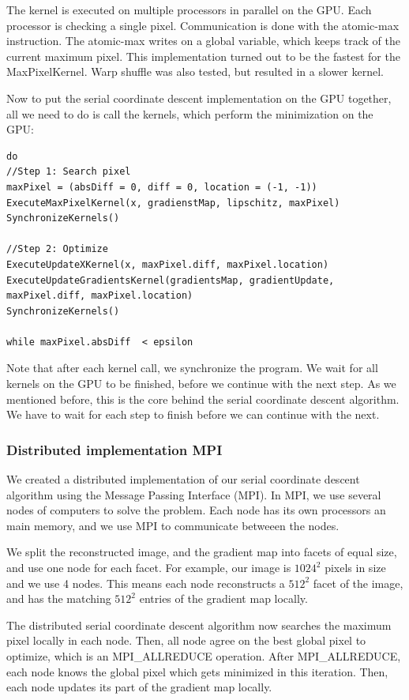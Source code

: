 The kernel is executed on multiple processors in parallel on the GPU. Each processor is checking a single pixel. Communication is done with the atomic-max instruction. The atomic-max writes on a global variable, which keeps track of the current maximum pixel. This implementation turned out to be the fastest for the MaxPixelKernel. Warp shuffle\cite{keplerShuffle} was also tested, but resulted in a slower kernel.

Now to put the serial coordinate descent implementation on the GPU together, all we need to do is call the kernels, which perform the minimization on the GPU:


\begin{lstlisting}
do 
//Step 1: Search pixel
maxPixel = (absDiff = 0, diff = 0, location = (-1, -1))
ExecuteMaxPixelKernel(x, gradienstMap, lipschitz, maxPixel)
SynchronizeKernels()

//Step 2: Optimize
ExecuteUpdateXKernel(x, maxPixel.diff, maxPixel.location)
ExecuteUpdateGradientsKernel(gradientsMap, gradientUpdate, maxPixel.diff, maxPixel.location)
SynchronizeKernels()

while maxPixel.absDiff  < epsilon
\end{lstlisting}

Note that after each kernel call, we synchronize the program. We wait for all kernels on the GPU to be finished, before we continue with the next step. As we mentioned before, this is the core behind the serial coordinate descent algorithm. We have to wait for each step to finish before we can continue with the next. 


\subsubsection{Distributed implementation MPI}
We created a distributed implementation of our serial coordinate descent algorithm using the Message Passing Interface (MPI). In MPI, we use several nodes of computers to solve the problem. Each node has its own processors an main memory, and we use MPI to communicate betweeen the nodes. 

We split the reconstructed image, and the gradient map into facets of equal size, and use one node for each facet. For example, our image is $1024^2$ pixels in size and we use 4 nodes. This means each node reconstructs a $512^2$ facet of the image, and has the matching $512^2$ entries of the gradient map locally. 

The distributed serial coordinate descent algorithm now searches the maximum pixel locally in each node. Then, all node agree on the best global pixel to optimize, which is an MPI\_ALLREDUCE operation. After MPI\_ALLREDUCE, each node knows the global pixel which gets minimized in this iteration. Then, each node updates its part of the gradient map locally.


